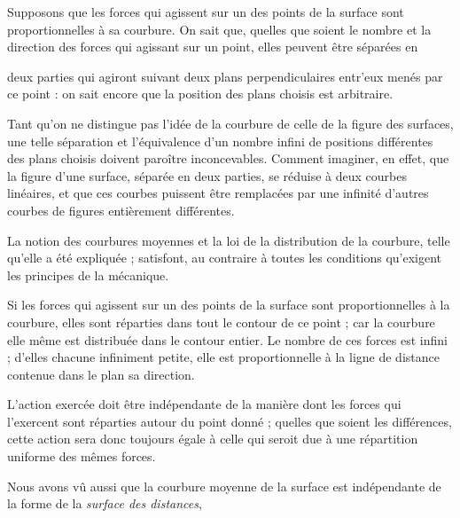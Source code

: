 \documentclass[11pt,a4paper]{article}
\begin{document}
Supposons que les forces qui agissent sur un des points de la surface
sont proportionnelles à sa courbure. On sait que, quelles que soient
le nombre et la direction des forces qui agissant sur un point, elles
peuvent être séparées en

deux parties qui agiront suivant deux plans perpendiculaires entr'eux
menés par ce point : on sait encore que la position des plans choisis
est arbitraire.

Tant qu'on ne distingue pas l'idée de la courbure de celle de la
figure des surfaces, une telle séparation et l'équivalence d'un nombre
infini de positions différentes des plans choisis doivent paroître
inconcevables. Comment imaginer, en effet, que la figure d'une
surface, séparée en deux parties, se réduise à deux courbes linéaires,
et que ces courbes puissent être remplacées par une infinité d'autres
courbes de figures entièrement différentes.

La notion des courbures moyennes et la loi de la distribution de la
courbure, telle qu'elle a été expliquée ; satisfont, au contraire à
toutes les conditions qu'exigent les principes de la mécanique.

Si les forces qui agissent sur un des points de la surface sont
proportionnelles à la courbure, elles sont réparties dans tout le
contour de ce point ; car la courbure elle même est distribuée dans le
contour entier. Le nombre de ces forces est infini ; d'elles
\struck{\ill{}} chacune infiniment petite,  elle
est proportionnelle à la ligne de distance contenue dans le plan
 sa direction.

L'action exercée doit être indépendante de la manière dont les forces
qui l'exercent sont réparties autour du point donné ; quelles que
soient les différences, cette action sera donc toujours égale à celle
qui seroit due à une répartition uniforme des mêmes forces.

Nous avons vû aussi que la courbure moyenne de la surface est
indépendante de la forme de la \emph{surface des distances},
\end{document}
